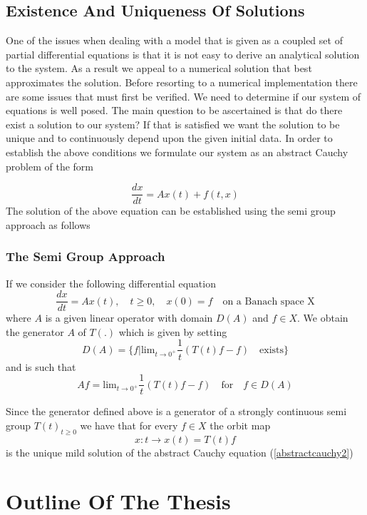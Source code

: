\subsection{Existence And Uniqueness Of Solutions}
One of the issues when dealing with a model that is given as a coupled set of partial differential equations is that it is not easy to derive an analytical solution to the system. As a result we appeal to a numerical solution that best approximates the solution.
Before resorting to a numerical implementation there are some issues that must first be verified. We need to determine if our system of equations is well posed. The main question to be ascertained is that do there exist a solution to our system? If that is satisfied we want the solution to be unique and to continuously depend upon the given initial data.
In order to establish the above conditions we formulate our system as an abstract Cauchy problem of the form

\begin{equation}\label{abstractcauchy1}
\frac{dx}{dt} = A x(t) + f(t,x) 
\end{equation}
The solution of the above equation can be established using the semi group approach as follows
\subsubsection{The Semi Group Approach}
If we consider the following differential equation
\begin{equation}\label{abstractcauchy2}
\frac{dx}{dt} = A x(t), \quad t \geq 0 , \quad x(0)=f \quad \text{on a Banach space X}
\end{equation}
 where $A$ is a given linear operator with domain $D(A)$ and $f \in X $.
 We obtain the generator $A$ of $T(.)$ which is given by setting 
 \[D(A)=\lbrace f\vert \text{lim}_{t\rightarrow 0^{+}} \frac{1}{t}(T(t)f-f) \quad \text{exists}\rbrace \] and is such that
 \[Af=\text{lim}_{t\rightarrow 0^{+}} \frac{1}{t}(T(t)f-f) \quad \text{for} \quad f \in D(A) \]
 
 
Since the generator defined above is a generator of a strongly continuous semi group $T(t)_{t\geq 0}$ we have that for every $f\in X$ the orbit map 
 \[x:t \longrightarrow x(t)=T(t)f\]
 is the unique mild solution of the abstract Cauchy equation (\ref{abstractcauchy2}) 
 
 
 
 

\section{Outline Of The Thesis}
